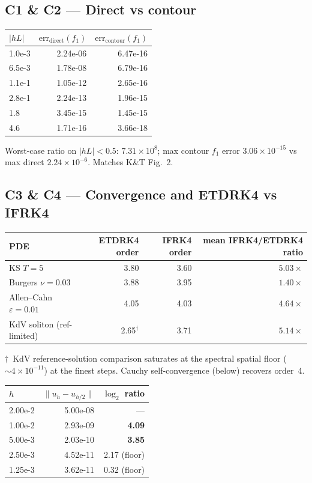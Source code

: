 \documentclass[11pt]{article}
\begin{document}
\subsection*{C1 \& C2 --- Direct vs contour}
\begin{center}\small
\begin{tabular}{lrr}
\toprule
$|hL|$ & $\mathrm{err}_{\text{direct}}(f_1)$ & $\mathrm{err}_{\text{contour}}(f_1)$ \\
\midrule
1.0e-3 & 2.24e-06 & 6.47e-16 \\
6.5e-3 & 1.78e-08 & 6.79e-16 \\
1.1e-1 & 1.05e-12 & 2.65e-16 \\
2.8e-1 & 2.24e-13 & 1.96e-15 \\
1.8    & 3.45e-15 & 1.45e-15 \\
4.6    & 1.71e-16 & 3.66e-18 \\
\bottomrule
\end{tabular}
\end{center}
Worst-case ratio on $|hL|<0.5$: $7.31\times10^{8}$; max contour $f_1$
error $3.06\times10^{-15}$ vs max direct $2.24\times10^{-6}$. Matches
K\&T Fig.~2.

\subsection*{C3 \& C4 --- Convergence and ETDRK4 vs IFRK4}
\begin{center}\small
\begin{tabular}{lrrr}
\toprule
PDE & ETDRK4 order & IFRK4 order & mean IFRK4/ETDRK4 ratio \\
\midrule
KS $T{=}5$              & 3.80 & 3.60 & $5.03\times$ \\
Burgers $\nu{=}0.03$    & 3.88 & 3.95 & $1.40\times$ \\
Allen--Cahn $\varepsilon{=}0.01$ & 4.05 & 4.03 & $4.64\times$ \\
KdV soliton (ref-limited) & 2.65$^\dagger$ & 3.71 & $5.14\times$ \\
\bottomrule
\end{tabular}
\end{center}

$\dagger$~KdV reference-solution comparison saturates at the spectral
spatial floor ($\sim 4\times10^{-11}$) at the finest steps. Cauchy
self-convergence (below) recovers order~4.

\begin{center}\small
\begin{tabular}{lrr}
\toprule
$h$ & $\|u_h - u_{h/2}\|$ & $\log_2$ ratio \\
\midrule
2.00e-2 & 5.00e-08 & --- \\
1.00e-2 & 2.93e-09 & \textbf{4.09} \\
5.00e-3 & 2.03e-10 & \textbf{3.85} \\
2.50e-3 & 4.52e-11 & 2.17 (floor) \\
1.25e-3 & 3.62e-11 & 0.32 (floor) \\
\bottomrule
\end{tabular}
\end{center}
\end{document}
